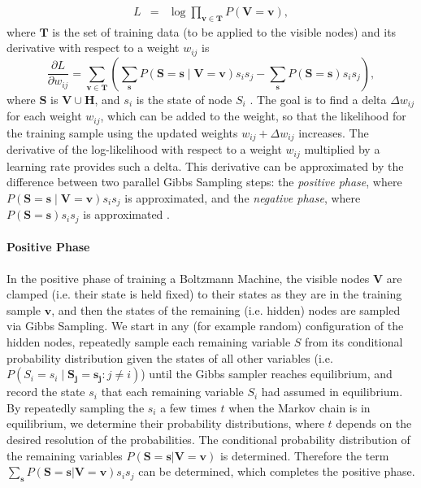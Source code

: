 \begin{eqnarray*}
L & = & \log\prod_{\mathbf{v}\in\mathbf{T}}P(\mathbf{V}=\mathbf{v}),
\end{eqnarray*}
 where $\mathbf{T}$ is the set of training data (to be applied to
the visible nodes) and its derivative with respect to a weight $w_{ij}$
is 
\[
\frac{\partial L}{\partial w_{ij}}=\sum_{\mathbf{v}\in\mathbf{T}}\left(\sum_{\mathbf{s}}P(\mathbf{S=s}\mid\mathbf{V=v})s_{i}s_{j}-\sum_{\mathbf{s}}P(\mathbf{S=s})s_{i}s_{j}\right),
\]
 where $\mathbf{S}$ is $\mathbf{V}\cup\mathbf{H}$, and $s_{i}$
is the state of node $S_{i}$ \cite{Neal1992}. The goal is to find
a delta $\Delta w_{ij}$ for each weight $w_{ij}$, which can be added
to the weight, so that the likelihood for the training sample using
the updated weights $w_{ij}+\Delta w_{ij}$ increases. The derivative
of the log-likelihood with respect to a weight $w_{ij}$ multiplied
by a learning rate provides such a delta. This
derivative can be approximated by the difference between two parallel
Gibbs Sampling steps: the \emph{positive phase}, where $P(\mathbf{S=s}\mid\mathbf{V=v})s_{i}s_{j}$
is approximated, and the \emph{negative phase}, where $P(\mathbf{S=s})s_{i}s_{j}$
is approximated \cite{Neal1992}.

\paragraph{Positive Phase}

In the positive phase of training a Boltzmann
Machine, the visible nodes $\mathbf{V}$ are clamped (i.e. their state
is held fixed) to their states as they are in the training sample
$\mathbf{v}$, and then the states of the remaining (i.e. hidden)
nodes are sampled via Gibbs Sampling. We start in any (for example
random) configuration of the hidden nodes, repeatedly sample each
remaining variable $S$ from its conditional probability distribution
given the states of all other variables (i.e. $P(S_{i}=s_{i}\mid\mathbf{S_{j}}=\mathbf{s_{j}}:j\neq i)$)
until the Gibbs sampler reaches equilibrium, and record the state
$s_{i}$ that each remaining variable $S_{i}$ had assumed in equilibrium.
By repeatedly sampling the $s_{i}$ a few times $t$ when the Markov
chain is in equilibrium, we determine their probability distributions,
where $t$ depends on the desired resolution of the probabilities.
The conditional probability distribution of the remaining variables
$P(\mathbf{S=s}|\mathbf{V=v})$ is determined. Therefore the term
$\sum_{\mathbf{s}}P(\mathbf{S=s}|\mathbf{V=v})s_{i}s_{j}$ can be
determined, which completes the positive phase.

